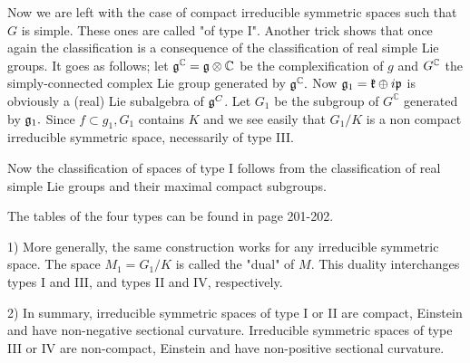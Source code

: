 Now we are left with the case of compact irreducible symmetric
spaces such that $G$ is simple. These ones are called "of type
I". Another trick shows that once again the classification is a
consequence of the classification of real simple Lie groups. It
goes as follows; let ${\mathfrak g}^{\mathbb{C}} = {\mathfrak g} \otimes
\mathbb{C}$ be the complexification of $g$ and $G^{{\mathbb C}}$ the
simply-connected complex Lie group generated by ${\mathfrak g}^{{\mathbb C}} .$
Now ${\mathfrak g}_{1}=\mathfrak{k} \oplus i {\mathfrak p}$ is obviously
a (real) Lie subalgebra of ${\mathfrak g}^{C}$. Let $G_{1}$ be the
subgroup of $G^{\mathbb{C}}$ generated by ${\mathfrak g}_{1} .$ Since $f
\subset g_{1}, G_{1}$ contains $K$ and we see easily that $G_{1}
/ K$ is a non compact irreducible symmetric space, necessarily
of type III.

Now the classification of spaces of type I follows from the
classification of real simple Lie groups and their maximal
compact subgroups.

The tables of the four types can be found in \cite{Besse} page
201-202.

\begin{remark}
	 1) More generally, the same construction works for any
	 irreducible symmetric space. The space $M_{1}=G_{1} / K$ is
	 called the "dual" of $M .$ This duality interchanges types
	 I and III, and types II and IV, respectively.
	 
	2) In summary, irreducible symmetric spaces of type I or II
	are compact, Einstein and have non-negative sectional
	curvature. Irreducible symmetric spaces of type III or IV
	are non-compact, Einstein and have non-positive sectional
	curvature.
\end{remark}
